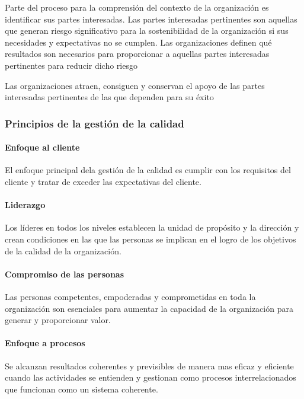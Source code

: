 		\par \noindent 
			Parte del proceso para la comprensión del contexto de la organización es identificar sus partes
			interesadas. Las partes interesadas pertinentes son aquellas que generan riesgo significativo para la
			sostenibilidad de la organización si sus necesidades y expectativas no se cumplen. Las organizaciones
			definen qué resultados son necesarios para proporcionar a aquellas partes interesadas pertinentes para
			reducir dicho riesgo
			
		\par \noindent 
			Las organizaciones atraen, consiguen y conservan el apoyo de las partes interesadas pertinentes de las
			que dependen para su éxito
				
	\subsubsection{Principios de la gestión de la calidad}
		\paragraph{Enfoque al cliente}
			El enfoque principal dela gestión de la calidad es cumplir con los requisitos del cliente y tratar de exceder
			las expectativas del cliente.
		\paragraph{Liderazgo}
			Los líderes en todos los niveles establecen la unidad de propósito y la dirección y crean condiciones en
			las que las personas se implican en el logro de los objetivos de la calidad de la organización.
			
		\newpage
		\thispagestyle{plain}
		
		\paragraph{Compromiso de las personas}
			Las personas competentes, empoderadas y comprometidas en toda la organización son esenciales para
			aumentar la capacidad de la organización para generar y proporcionar valor.
		\paragraph{Enfoque a procesos}
			Se alcanzan resultados coherentes y previsibles de manera mas eficaz y eficiente cuando las actividades
			se entienden y gestionan como procesos interrelacionados que funcionan como un sistema coherente.
